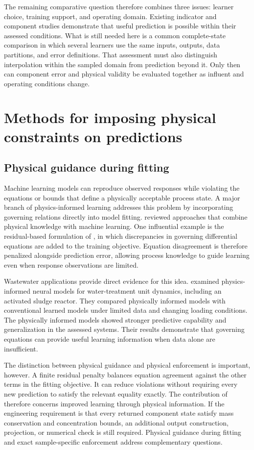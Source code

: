 The remaining comparative question therefore combines three issues: learner choice, training support, and operating domain. Existing indicator and component studies demonstrate that useful prediction is possible within their assessed conditions. What is still needed here is a common complete-state comparison in which several learners use the same inputs, outputs, data partitions, and error definitions. That assessment must also distinguish interpolation within the sampled domain from prediction beyond it. Only then can component error and physical validity be evaluated together as influent and operating conditions change.

\section{Methods for imposing physical constraints on predictions}

\subsection{Physical guidance during fitting}

Machine learning models can reproduce observed responses while violating the equations or bounds that define a physically acceptable process state. A major branch of physics-informed learning addresses this problem by incorporating governing relations directly into model fitting. \citet{Karniadakis2021} reviewed approaches that combine physical knowledge with machine learning. One influential example is the residual-based formulation of \citet{Raissi2019}, in which discrepancies in governing differential equations are added to the training objective. Equation disagreement is therefore penalized alongside prediction error, allowing process knowledge to guide learning even when response observations are limited.

Wastewater applications provide direct evidence for this idea. \citet{Li2024} examined physics-informed neural models for water-treatment unit dynamics, including an activated sludge reactor. They compared physically informed models with conventional learned models under limited data and changing loading conditions. The physically informed models showed stronger predictive capability and generalization in the assessed systems. Their results demonstrate that governing equations can provide useful learning information when data alone are insufficient.

The distinction between physical guidance and physical enforcement is important, however. A finite residual penalty balances equation agreement against the other terms in the fitting objective. It can reduce violations without requiring every new prediction to satisfy the relevant equality exactly. The contribution of \citet{Li2024} therefore concerns improved learning through physical information. If the engineering requirement is that every returned component state satisfy mass conservation and concentration bounds, an additional output construction, projection, or numerical check is still required. Physical guidance during fitting and exact sample-specific enforcement address complementary questions.

